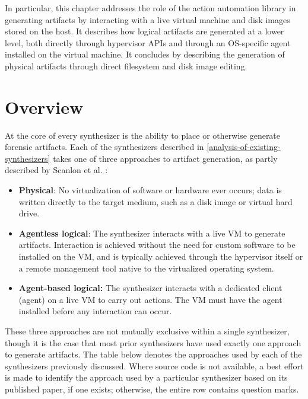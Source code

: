 In particular, this chapter addresses the role of the action automation
library in generating artifacts by interacting with a live virtual
machine and disk images stored on the host. It describes how logical
artifacts are generated at a lower level, both directly through
hypervisor APIs and through an OS-specific agent installed on the
virtual machine. It concludes by describing the generation of physical
artifacts through direct filesystem and disk image editing.

\section{Overview}\label{overview}

At the core of every synthesizer is the ability to place or otherwise
generate forensic artifacts. Each of the synthesizers described in
\autoref{analysis-of-existing-synthesizers} takes one of three approaches to artifact generation, as
partly described by Scanlon et al.
\cite{scanlonEviPlantEfficientDigital2017}:

\begin{itemize}
\tightlist
\item
  \textbf{Physical}: No virtualization of software or hardware ever
  occurs; data is written directly to the target medium, such as a disk
  image or virtual hard drive.
\item
  \textbf{Agentless logical}: The synthesizer interacts with a live VM
  to generate artifacts. Interaction is achieved without the need for
  custom software to be installed on the VM, and is typically achieved
  through the hypervisor itself or a remote management tool native to
  the virtualized operating system.
\item
  \textbf{Agent-based logical:} The synthesizer interacts with a
  dedicated client (agent) on a live VM to carry out actions. The VM
  must have the agent installed before any interaction can occur.
\end{itemize}

These three approaches are not mutually exclusive within a single
synthesizer, though it is the case that most prior synthesizers have
used exactly one approach to generate artifacts. The table below denotes
the approaches used by each of the synthesizers previously discussed.
Where source code is not available, a best effort is made to identify
the approach used by a particular synthesizer based on its published
paper, if one exists; otherwise, the entire row contains question marks.

